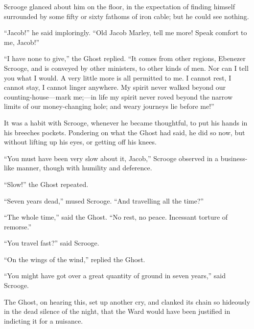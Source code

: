 \documentclass[paper=a5,BCOR=15mm,twoside,DIV=15,headinclude=off,12pt,chapterprefix=off,openany,headings=huge]{scrbook} %
\begin{document}
Scrooge glanced about him on the floor, in the expectation of finding himself surrounded by some fifty or sixty fathoms of iron cable; but he could see nothing.

\enquote{Jacob!} he said imploringly. \enquote{Old Jacob Marley, tell me more! Speak comfort to me, Jacob!}

\enquote{I have none to give,} the Ghost replied. \enquote{It comes from other regions, Ebenezer Scrooge, and is conveyed by other ministers, to other kinds of men. Nor can I tell you what I would. A very little more is all permitted to me. I cannot rest, I cannot stay, I cannot linger anywhere. My spirit never walked beyond our counting-house—mark me;—in life my spirit never roved beyond the narrow limits of our money-changing hole; and weary journeys lie before me!}

It was a habit with Scrooge, whenever he became thoughtful, to put his hands in his breeches pockets. Pondering on what the Ghost had said, he did so now, but without lifting up his eyes, or getting off his knees.

\enquote{You must have been very slow about it, Jacob,} Scrooge observed in a business-like manner, though with humility and deference.

\enquote{Slow!} the Ghost repeated.

\enquote{Seven years dead,} mused Scrooge. \enquote{And travelling all the time?}

\enquote{The whole time,} said the Ghost. \enquote{No rest, no peace. Incessant torture of remorse.}

\enquote{You travel fast?} said Scrooge.

\enquote{On the wings of the wind,} replied the Ghost. 

\enquote{You might have got over a great quantity of ground in seven years,} said Scrooge.

The Ghost, on hearing this, set up another cry, and clanked its chain so hideously in the dead silence of the night, that the Ward would have been justified in indicting it for a nuisance.
\end{document}
